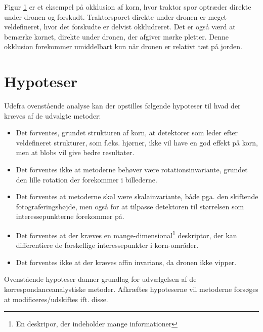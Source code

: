 \begin{itemize}
{\begin{figure}[H]
    \begin{center}    
       \caption{\textcolor{gray}{\footnotesize \textit{ }}}
    \label{fig:okklusion}
     \end{center}
     \vspace{-2.5em}
  \end{figure} \noindent
Figur \ref{fig:okklusion} er et eksempel på okklusion af korn, hvor traktor spor optræder direkte under dronen og forskudt. Traktorsporet direkte under dronen er meget veldefineret, hvor det forskudte er delvist okkludreret. Det er også værd at bemærke kornet, direkte under dronen, der afgiver mørke pletter. Denne okklusion forekommer umiddelbart kun når dronen er relativt tæt på jorden.}
\end{itemize}
\section{Hypoteser}
Udefra ovenstående analyse kan der opstilles følgende hypoteser til hvad der kræves af de udvalgte metoder:
\begin{itemize}
\item{ Det forventes, grundet strukturen af korn, at detektorer som leder efter veldefineret strukturer, som f.eks. hjørner, ikke vil have en god effekt på korn, men at blobs vil give bedre resultater.}
\item{ Det forventes ikke at metoderne behøver være rotationsinvariante, grundet den lille rotation der forekommer i billederne. }
\item{ Det forventes at metoderne skal være skalainvariante, både pga. den skiftende fotograferingshøjde, men også for at tilpasse detektoren til størrelsen som interessepunkterne forekommer på.}
\item{ Det forventes at der kræves en mange-dimensional\footnote{En deskripor, der indeholder mange informationer} deskriptor, der kan differentiere de forskellige interessepunkter i korn-områder.}
\item{ Det forventes ikke at der kræves affin invarians, da dronen ikke vipper. }
\end{itemize}
Ovenstående hypoteser danner grundlag for udvælgelsen af de korrespondanceanalystiske metoder. Afkræftes hypoteserne vil metoderne forsøges at modificeres/udskiftes ift. disse.